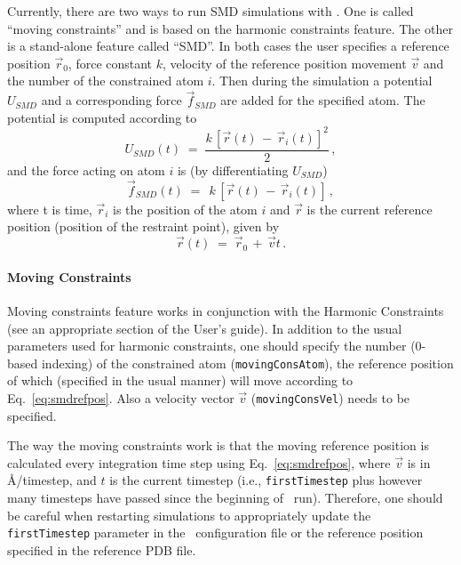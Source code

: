 Currently, there are two ways to run SMD simulations with \NAMD. One
is called ``moving constraints'' and is based on the harmonic
constraints feature. The other is a stand-alone feature called
``SMD''. In both cases the user specifies a reference position 
$\vec r_0$, force constant $k$, velocity of the reference position
movement $\vec v$ and the number of the constrained atom $i$. Then
during the simulation a potential $U_{SMD}$ and a corresponding force
$\vec f_{SMD}$ are added for the specified atom. 
The potential is computed according to
\begin{equation}
   U_{SMD}(t) \; = \; \frac{k \, [\vec r(t) \, - \, \vec r_i(t)]^2}{2} \, ,
\end{equation}
and the force acting on atom $i$ is (by differentiating $U_{SMD}$) 
\begin{equation}
   \vec f_{SMD}(t) \; = \; \, k \, [\vec r(t) \, - \, \vec r_i(t)] \, ,
\label{eq:smdforce}
\end{equation}
where t is time, $\vec r_i$ is the position of the atom $i$ and 
$\vec r$ is the current reference position (position of the restraint
point), given by 
\begin{equation}
   \vec r(t) \; = \; \vec r_0 \, + \, \vec v t \,.
\label{eq:smdrefpos}
\end{equation}

\paragraph*{Moving Constraints}

Moving constraints feature works in conjunction with the Harmonic
Constraints (see an appropriate section of the User's guide).  In
addition to the usual parameters used for harmonic constraints, one
should specify the number (0-based indexing) of the constrained atom
({\tt movingConsAtom}), the reference position of which (specified in
the usual manner) will move according to Eq.~\ref{eq:smdrefpos}. Also
a velocity vector $\vec v$ ({\tt movingConsVel}) needs to be specified.

The way the moving constraints work is that the moving reference
position is calculated every integration time step using
Eq.~\ref{eq:smdrefpos}, where $\vec v$ is in \AA/timestep, and $t$ is the
current timestep (i.e., {\tt firstTimestep} plus however many
timesteps have passed since the beginning of \NAMD\ run). Therefore,
one should be careful when restarting simulations to appropriately
update the {\tt firstTimestep} parameter in the \NAMD\ configuration
file or the reference position specified in the reference PDB file.

